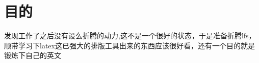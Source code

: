 \section{目的}
发现工作了之后没有设么折腾的动力,这不是一个很好的状态，于是准备折腾lfs，顺带学习下latex这已强大的排版工具出来的东西应该很好看，还有一个目的\newline 就是锻炼下自己的英文\newline


